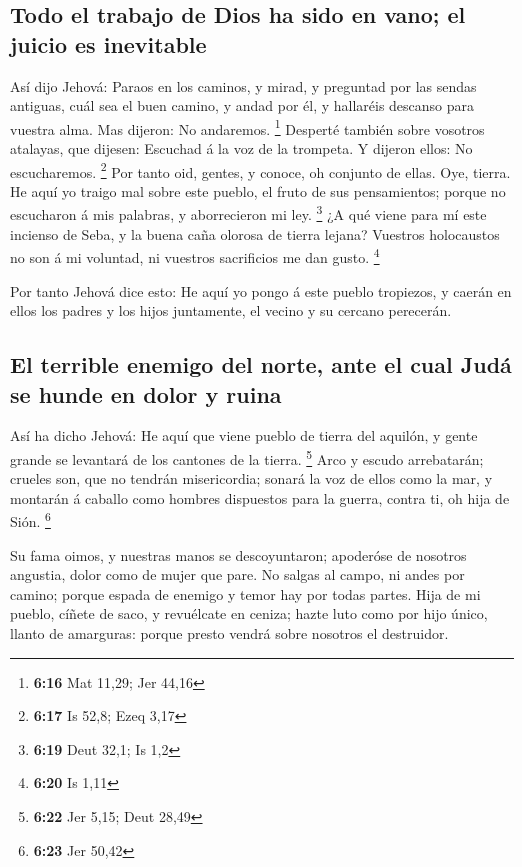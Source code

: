 \hypertarget{todo-el-trabajo-de-dios-ha-sido-en-vano-el-juicio-es-inevitable}{%
\subsection{Todo el trabajo de Dios ha sido en vano; el juicio es
inevitable}\label{todo-el-trabajo-de-dios-ha-sido-en-vano-el-juicio-es-inevitable}}

 Así dijo Jehová: Paraos en los caminos, y mirad, y
preguntad por las sendas antiguas, cuál sea el buen camino, y andad por
él, y hallaréis descanso para vuestra alma. Mas dijeron: No andaremos.
\footnote{\textbf{6:16} Mat 11,29; Jer 44,16}  Desperté
también sobre vosotros atalayas, que dijesen: Escuchad á la voz de la
trompeta. Y dijeron ellos: No escucharemos. \footnote{\textbf{6:17} Is
  52,8; Ezeq 3,17}  Por tanto oid, gentes, y conoce, oh
conjunto de ellas.  Oye, tierra. He aquí yo traigo mal
sobre este pueblo, el fruto de sus pensamientos; porque no escucharon á
mis palabras, y aborrecieron mi ley. \footnote{\textbf{6:19} Deut 32,1;
  Is 1,2}  ¿A qué viene para mí este incienso de Seba, y la
buena caña olorosa de tierra lejana? Vuestros holocaustos no son á mi
voluntad, ni vuestros sacrificios me dan gusto. \footnote{\textbf{6:20}
  Is 1,11}

 Por tanto Jehová dice esto: He aquí yo pongo á este pueblo
tropiezos, y caerán en ellos los padres y los hijos juntamente, el
vecino y su cercano perecerán.

\hypertarget{el-terrible-enemigo-del-norte-ante-el-cual-juduxe1-se-hunde-en-dolor-y-ruina}{%
\subsection{El terrible enemigo del norte, ante el cual Judá se hunde en
dolor y
ruina}\label{el-terrible-enemigo-del-norte-ante-el-cual-juduxe1-se-hunde-en-dolor-y-ruina}}

 Así ha dicho Jehová: He aquí que viene pueblo de tierra
del aquilón, y gente grande se levantará de los cantones de la tierra.
\footnote{\textbf{6:22} Jer 5,15; Deut 28,49}  Arco y
escudo arrebatarán; crueles son, que no tendrán misericordia; sonará la
voz de ellos como la mar, y montarán á caballo como hombres dispuestos
para la guerra, contra ti, oh hija de Sión. \footnote{\textbf{6:23} Jer
  50,42}

 Su fama oimos, y nuestras manos se descoyuntaron;
apoderóse de nosotros angustia, dolor como de mujer que pare.
 No salgas al campo, ni andes por camino; porque espada de
enemigo y temor hay por todas partes.  Hija de mi pueblo,
cíñete de saco, y revuélcate en ceniza; hazte luto como por hijo único,
llanto de amarguras: porque presto vendrá sobre nosotros el destruidor.

